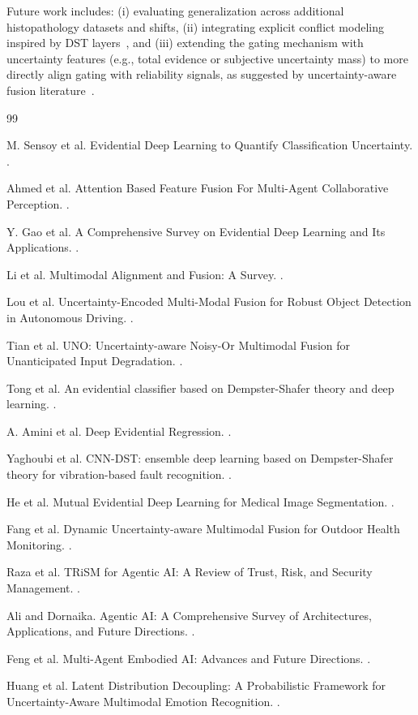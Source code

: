 \documentclass[10pt]{article}
\begin{document}
Future work includes: (i) evaluating generalization across additional histopathology datasets and shifts, (ii) integrating explicit conflict modeling inspired by DST layers~\cite{tong2021,yaghoubi2021}, and (iii) extending the gating mechanism with uncertainty features (e.g., total evidence or subjective uncertainty mass) to more directly align gating with reliability signals, as suggested by uncertainty-aware fusion literature~\cite{lou2023,tian2020,he2025,fang2025}.

\begin{thebibliography}{99}

M. Sensoy et al.
\newblock Evidential Deep Learning to Quantify Classification Uncertainty.
.

Ahmed et al.
\newblock Attention Based Feature Fusion For Multi-Agent Collaborative Perception.
.

Y. Gao et al.
\newblock A Comprehensive Survey on Evidential Deep Learning and Its Applications.
.

Li et al.
\newblock Multimodal Alignment and Fusion: A Survey.
.

Lou et al.
\newblock Uncertainty-Encoded Multi-Modal Fusion for Robust Object Detection in Autonomous Driving.
.

Tian et al.
\newblock UNO: Uncertainty-aware Noisy-Or Multimodal Fusion for Unanticipated Input Degradation.
.

Tong et al.
\newblock An evidential classifier based on Dempster-Shafer theory and deep learning.
.

A. Amini et al.
\newblock Deep Evidential Regression.
.

Yaghoubi et al.
\newblock CNN-DST: ensemble deep learning based on Dempster-Shafer theory for vibration-based fault recognition.
.

He et al.
\newblock Mutual Evidential Deep Learning for Medical Image Segmentation.
.

Fang et al.
\newblock Dynamic Uncertainty-aware Multimodal Fusion for Outdoor Health Monitoring.
.

Raza et al.
\newblock TRiSM for Agentic AI: A Review of Trust, Risk, and Security Management.
.

Ali and Dornaika.
\newblock Agentic AI: A Comprehensive Survey of Architectures, Applications, and Future Directions.
.

Feng et al.
\newblock Multi-Agent Embodied AI: Advances and Future Directions.
.

Huang et al.
\newblock Latent Distribution Decoupling: A Probabilistic Framework for Uncertainty-Aware Multimodal Emotion Recognition.
.

\end{thebibliography}
\end{document}
